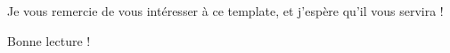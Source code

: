 \documentclass[../main.tex]{subfiles}
\begin{document}

Je vous remercie de vous intéresser à ce template, et j'espère qu'il vous servira !

Bonne lecture !

\pagestyle{sommaire}
\end{document}
